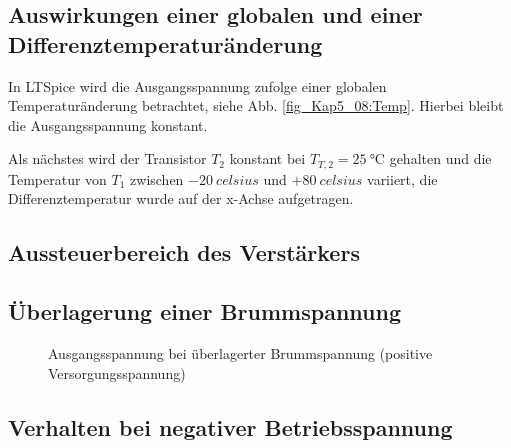 \subsection{Auswirkungen einer globalen und einer Differenztemperaturänderung}
In LTSpice wird die Ausgangsspannung zufolge einer globalen Temperaturänderung betrachtet, siehe Abb. \ref{fig_Kap5_08:Temp}. Hierbei bleibt die Ausgangsspannung konstant.


Als nächstes wird der Transistor $T_2$ konstant bei $T_{T,2} = \SI{25}{\celsius}$ gehalten und die Temperatur von $T_1$ zwischen $-\SI{20}{celsius}$ und $+\SI{80}{celsius}$ variiert, die Differenztemperatur wurde auf der x-Achse aufgetragen.


\subsection{Aussteuerbereich des Verstärkers}


\subsection{Überlagerung einer Brummspannung}

\begin{figure}[H]
	\centering \small
	\scalebox{0.9}{}
	\caption{Ausgangsspannung bei überlagerter Brummspannung (positive Versorgungsspannung)}
	\label{fig_Kap5_11:Brumm}
\end{figure}

\subsection{Verhalten bei negativer Betriebsspannung}


